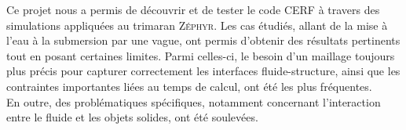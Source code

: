 \documentclass[../main.tex]{subfiles}
\begin{document}
Ce projet nous a permis de découvrir et de tester le code CERF à travers des simulations appliquées au trimaran \textsc{Zéphyr}. Les cas étudiés, allant de la mise à l'eau à la submersion par une vague, ont permis d'obtenir des résultats pertinents tout en posant certaines limites. Parmi celles-ci, le besoin d'un maillage toujours plus précis pour capturer correctement les interfaces fluide-structure, ainsi que les contraintes importantes liées au temps de calcul, ont été les plus fréquentes.\\

En outre, des problématiques spécifiques, notamment concernant l'interaction entre le fluide et les objets solides, ont été soulevées.
\end{document}

